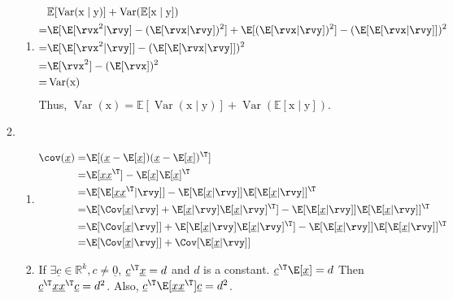 \documentclass[a4paper]{article}
\begin{document}
\begin{enumerate}
\begin{enumerate}
\begin{enumerate}
        \item
        \begin{equation*}
            \begin{align*}
                & \mathbb{E}[\operatorname{Var}(\mathrm{x} \mid \mathrm{y})]+\operatorname{Var}(\mathbb{E}[\mathrm{x} \mid \mathrm{y}])\\
                =& \E[\E[\rvx^2|\rvy] - (\E[\rvx|\rvy])^2] + \E[(\E[\rvx|\rvy])^2] - (\E[\E[\rvx|\rvy]])^2\\
                =& \E[\E[\rvx^2|\rvy]] - (\E[\E[\rvx|\rvy]])^2\\
                =& \E[\rvx^2] - (\E[\rvx])^2\\
                =& \operatorname{Var}(\mathrm{x})
            \end{align*}
        \end{equation*}
        Thus, $\operatorname{Var}(\mathrm{x})=\mathbb{E}[\operatorname{Var}(\mathrm{x} \mid \mathrm{y})]+\operatorname{Var}(\mathbb{E}[\mathrm{x} \mid \mathrm{y}])$.
    \end{enumerate}
    \item
    \begin{enumerate}
        \item 
        \begin{equation*}
            \begin{align*}
        \cov(\underline{x}) = & \E[(\underline{x}-\E[\underline{x}])(\underline{x}-\E[\underline{x}])^\T] \\    
                    = & \E[\underline{x}\underline{x}^\T]-\E[\underline{x}]\E[\underline{x}]^\T\\
                    = & \E[\E[\underline{x}\underline{x}^\T|\rvy]]-\E[\E[\underline{x}|\rvy]]\E[\E[\underline{x}|\rvy]]^\T\\
                    = & \E[\Cov[\underline{x}|\rvy]+\E[\underline{x}|\rvy]\E[\underline{x}|\rvy]^\T]-\E[\E[\underline{x}|\rvy]]\E[\E[\underline{x}|\rvy]]^\T\\
                    = & \E[\Cov[\underline{x}|\rvy]]+\E[\E[\underline{x}|\rvy]\E[\underline{x}|\rvy]^\T]-\E[\E[\underline{x}|\rvy]]\E[\E[\underline{x}|\rvy]]^\T\\
                    = & \E[\Cov[\underline{x}|\rvy]]+\Cov[\E[\underline{x}|\rvy]]\\       
        \end{align*}
        \end{equation*}
        
        \item
        If $\exists \underline{c} \in \mathbb{R}^{k}, c \neq \underline{0}$, $\underline{c}^\T \underline{x} =d$ and $d$ is a constant. $\underline{c}^\T\E[\underline{x}]=d$ Then $\underline{c}^\T \underline{x}\underline{x}^\T\underline{c} =d^2$. Also, $\underline{c}^\T \E[\underline{x}\underline{x}^\T]\underline{c} =d^2$.
        

\end{enumerate}
\end{enumerate}
\end{enumerate}
\end{document}

